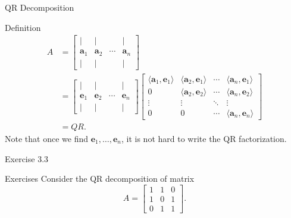 \documentclass{beamer}
\begin{document}
\begin{frame}{QR Decomposition}
    \begin{block}{Definition}
\begin{equation}
\begin{aligned}
A &= 
\begin{bmatrix}
\vert & \vert & & \vert \\
\mathbf{a}_1 & \mathbf{a}_2 & \cdots & \mathbf{a}_n \\
\vert & \vert & & \vert
\end{bmatrix} \\
&=
\begin{bmatrix}
\vert & \vert & & \vert \\
\mathbf{e}_1 & \mathbf{e}_2 & \cdots & \mathbf{e}_n \\
\vert & \vert & & \vert
\end{bmatrix}
\begin{bmatrix}
\langle \mathbf{a}_1, \mathbf{e}_1 \rangle & \langle \mathbf{a}_2, \mathbf{e}_1 \rangle & \cdots & \langle \mathbf{a}_n, \mathbf{e}_1 \rangle \\
0 & \langle \mathbf{a}_2, \mathbf{e}_2 \rangle & \cdots & \langle \mathbf{a}_n, \mathbf{e}_2 \rangle \\
\vdots & \vdots & \ddots & \vdots \\
0 & 0 & \cdots & \langle \mathbf{a}_n, \mathbf{e}_n \rangle
\end{bmatrix} \\
&= QR.
\end{aligned}
\end{equation}
Note that once we find \(\mathbf{e}_1, \ldots, \mathbf{e}_n\), it is not hard to write the QR factorization.
    \end{block}
\end{frame}

\begin{frame}{Exercise 3.3}
    \begin{block}{Exercises}
        Consider the QR decomposition of matrix
\[
A = \begin{bmatrix}
  1 & 1 & 0 \\
  1 & 0 & 1 \\
  0 & 1 & 1
\end{bmatrix}.
\]
    \end{block}    
\end{frame}
\end{document}
